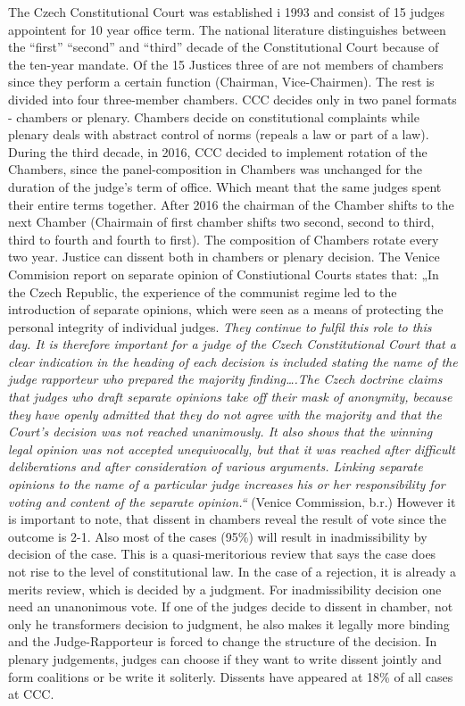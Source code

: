 \documentclass[
  11pt,
]{article}
\begin{document}
The Czech Constitutional Court was established i 1993 and consist of 15
judges appointent for 10 year office term. The national literature
distinguishes between the ``first'' ``second'' and ``third'' decade of
the Constitutional Court because of the ten-year mandate. Of the 15
Justices three of are not members of chambers since they perform a
certain function (Chairman, Vice-Chairmen). The rest is divided into
four three-member chambers. CCC decides only in two panel formats -
chambers or plenary. Chambers decide on constitutional complaints while
plenary deals with abstract control of norms (repeals a law or part of a
law). During the third decade, in 2016, CCC decided to implement
rotation of the Chambers, since the panel-composition in Chambers was
unchanged for the duration of the judge's term of office. Which meant
that the same judges spent their entire terms together. After 2016 the
chairman of the Chamber shifts to the next Chamber (Chairmain of first
chamber shifts two second, second to third, third to fourth and fourth
to first). The composition of Chambers rotate every two year. Justice
can dissent both in chambers or plenary decision. The Venice Commision
report on separate opinion of Constiutional Courts states that: „In the
Czech Republic, the experience of the communist regime led to the
introduction of separate opinions, which were seen as a means of
protecting the personal integrity of individual judges. \emph{They
continue to fulfil this role to this day. It is therefore important for
a judge of the Czech Constitutional Court that a clear indication in the
heading of each decision is included stating the name of the judge
rapporteur who prepared the majority finding\ldots.The Czech doctrine
claims that judges who draft separate opinions take off their mask of
anonymity, because they have openly admitted that they do not agree with
the majority and that the Court's decision was not reached unanimously.
It also shows that the winning legal opinion was not accepted
unequivocally, but that it was reached after difficult deliberations and
after consideration of various arguments. Linking separate opinions to
the name of a particular judge increases his or her responsibility for
voting and content of the separate opinion.``} (Venice Commission, b.r.)
However it is important to note, that dissent in chambers reveal the
result of vote since the outcome is 2-1. Also most of the cases (95\%)
will result in inadmissibility by decision of the case. This is a
quasi-meritorious review that says the case does not rise to the level
of constitutional law. In the case of a rejection, it is already a
merits review, which is decided by a judgment. For inadmissibility
decision one need an unanonimous vote. If one of the judges decide to
dissent in chamber, not only he transformers decision to judgment, he
also makes it legally more binding and the Judge-Rapporteur is forced to
change the structure of the decision. In plenary judgements, judges can
choose if they want to write dissent jointly and form coalitions or be
write it soliterly. Dissents have appeared at 18\% of all cases at CCC.
\end{document}
